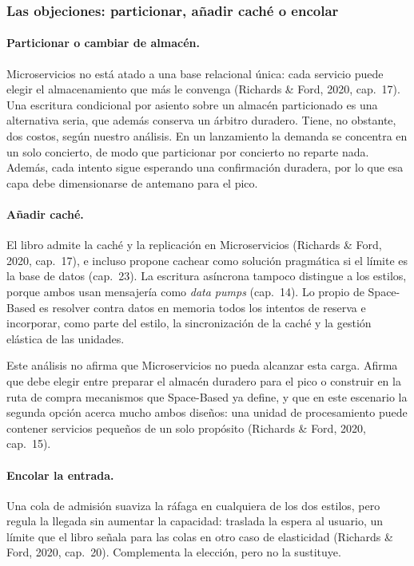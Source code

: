 \subsubsection{Las objeciones: particionar, añadir caché o encolar}

\paragraph{Particionar o cambiar de almacén.}
Microservicios no está atado a una base relacional única: cada servicio puede elegir
el almacenamiento que más le convenga (Richards \& Ford, 2020, cap.~17). Una escritura
condicional por asiento sobre un almacén particionado es una alternativa seria, que
además conserva un árbitro duradero. Tiene, no obstante, dos costos, según nuestro
análisis. En un lanzamiento la demanda se concentra en un solo concierto, de modo que
particionar por concierto no reparte nada. Además, cada intento sigue esperando una confirmación
duradera, por lo que esa capa debe dimensionarse de antemano para el pico.

\paragraph{Añadir caché.}
El libro admite la caché y la replicación en Microservicios (Richards \& Ford, 2020,
cap.~17), e incluso propone cachear como solución pragmática si el límite es la base
de datos (cap.~23). La escritura asíncrona tampoco distingue a los estilos, porque
ambos usan mensajería como \emph{data pumps} (cap.~14). Lo propio de Space-Based es
resolver contra datos en memoria todos los intentos de reserva e incorporar, como parte del
estilo, la sincronización de la caché y la gestión elástica de las unidades.

Este análisis no afirma que Microservicios no pueda alcanzar esta carga. Afirma que
debe elegir entre preparar el almacén duradero para el pico o construir en la ruta de
compra mecanismos que Space-Based ya define, y que en este escenario la segunda opción
acerca mucho ambos diseños: una unidad de procesamiento puede contener servicios
pequeños de un solo propósito (Richards \& Ford, 2020, cap.~15).

\paragraph{Encolar la entrada.}
Una cola de admisión suaviza la ráfaga en cualquiera de los dos estilos, pero regula
la llegada sin aumentar la capacidad: traslada la espera al usuario, un límite que el
libro señala para las colas en otro caso de elasticidad (Richards \& Ford, 2020,
cap.~20). Complementa la elección, pero no la sustituye.

